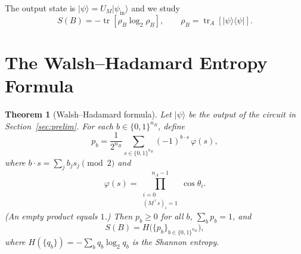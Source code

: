\documentclass[11pt,a4paper]{article}
\newtheorem{theorem}{Theorem}[section]
\newcommand{\VNE}{S}
\begin{document}
The output state is $|\psi\rangle = U_M|\psi_{\mathrm{in}}\rangle$ and we study
\begin{equation}
  \VNE(B) = -\operatorname{tr}[\rho_B \log_2 \rho_B],
  \qquad \rho_B = \operatorname{tr}_A[|\psi\rangle\langle\psi|].
\end{equation}

\section{The Walsh–Hadamard Entropy Formula}
\label{sec:wh}

\begin{theorem}[Walsh–Hadamard formula]
\label{thm:wh}
Let $|\psi\rangle$ be the output of the circuit in Section~\ref{sec:prelim}.
For each $b \in \{0,1\}^{n_B}$, define
\begin{equation}
  p_b = \frac{1}{2^{n_B}}
        \sum_{s \in \{0,1\}^{n_B}}
        (-1)^{b \cdot s}\, \varphi(s),
  \label{eq:wh}
\end{equation}
where $b \cdot s = \sum_j b_j s_j \pmod{2}$ and
\begin{equation}
  \varphi(s) = \prod_{\substack{i=0\\(M^\top s)_i = 1}}^{n_A-1} \cos\theta_i.
  \label{eq:phi}
\end{equation}
(An empty product equals $1$.)
Then $p_b \geq 0$ for all $b$, $\sum_b p_b = 1$, and
\begin{equation}
  \boxed{\VNE(B) = H\!\bigl(\{p_b\}_{b \in \{0,1\}^{n_B}}\bigr),}
  \label{eq:entropy}
\end{equation}
where $H(\{q_b\}) = -\sum_b q_b \log_2 q_b$ is the Shannon entropy.
\end{theorem}
\end{document}
